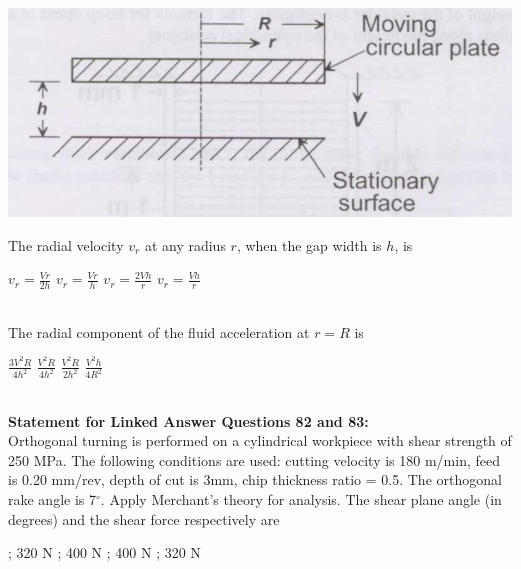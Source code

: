 \documentclass[addpoints,11pt]{exam}
\begin{document}
\begin{questions}
\begin{center}
    \includegraphics[scale=0.3]{q80}
\end{center}
    \question The radial velocity $v_r$ at any radius $r$, when the gap width is $h$, is\\

    \begin{oneparchoices}
        \choice $v_r = \frac{Vr}{2h}$
        \choice $v_r = \frac{Vr}{h}$
        \choice $v_r = \frac{2Vh}{r}$
        \choice $v_r = \frac{Vh}{r}$
    \end{oneparchoices}\\

    \question The radial component of the fluid acceleration at $r=R$ is\\
    
    \begin{oneparchoices}
        \choice $\frac{3V^2R}{4h^2}$
        \choice $\frac{V^2R}{4h^2}$
        \choice $\frac{V^2R}{2h^2}$
        \choice $\frac{V^2h}{4R^2}$
    \end{oneparchoices}\\
    
\normalsize\textbf{Statement for Linked Answer Questions 82 and 83:}\\
Orthogonal turning is performed on a cylindrical workpiece with shear strength of 250 MPa. The following conditions are used: cutting velocity is 180 m/min, feed is 0.20 mm/rev, depth of cut is 3mm, chip thickness ratio = 0.5. The orthogonal rake angle is 7$^\circ$. Apply Merchant's theory for analysis.
    \question The shear plane angle (in degrees) and the shear force respectively are\\

    \begin{oneparchoices}
         ; 320 N
         ; 400 N
         ; 400 N
         ; 320 N
    \end{oneparchoices}\\


\end{questions}
\end{document}
